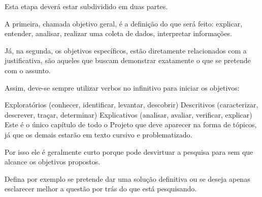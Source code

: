 Esta etapa deverá estar subdividido em duas partes.

A primeira, chamada objetivo geral, é a definição do que será feito: explicar, entender, analisar, realizar uma coleta de dados, interpretar informações.

Já, na segunda, os objetivos específicos, estão diretamente relacionados com a justificativa, são aqueles que buscam demonstrar exatamente o que se pretende com o assunto.

Assim, deve-se sempre utilizar verbos no infinitivo para iniciar os objetivos:

Exploratórios (conhecer, identificar, levantar, descobrir)
Descritivos (caracterizar, descrever, traçar, determinar)
Explicativos (analisar, avaliar, verificar, explicar)
Este é o único capítulo de todo o Projeto que deve aparecer na forma de tópicos, já que os demais estarão em texto cursivo e problematizado.

Por isso ele é geralmente curto porque pode desvirtuar a pesquisa para sem que alcance os objetivos propostos.

Defina por exemplo se pretende dar uma solução definitiva ou se deseja apenas esclarecer melhor a questão por trás do que está pesquisando.


